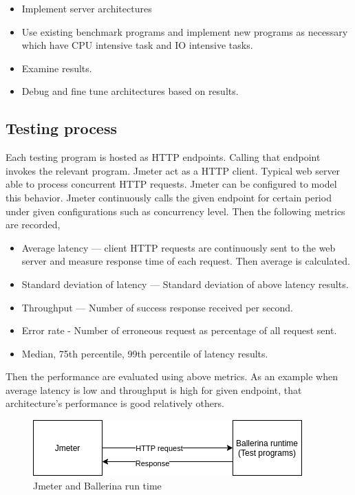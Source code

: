 \begin{itemize}
	\item Implement server architectures
	\item Use existing benchmark programs and implement new programs as necessary which have CPU intensive task and IO intensive tasks.
	\item Examine results.
	\item Debug and fine tune architectures based on results.
\end{itemize} 

\subsection{Testing process}

Each testing program is hosted as HTTP endpoints. Calling that endpoint invokes the relevant program. Jmeter act as a HTTP client. Typical web server able to process concurrent HTTP requests. Jmeter can be configured to model this behavior. Jmeter continuously calls the given endpoint for certain period under given configurations such as concurrency level. Then the following metrics are recorded,

\begin{itemize}
	\item Average latency — client HTTP requests are continuously sent to the web server and measure response time of each request. Then average is calculated.
	\item Standard deviation of latency — Standard deviation of above latency results.
	\item Throughput — Number of success response received per second.
	\item Error rate - Number of erroneous request as percentage of all request sent.
	\item Median, 75th percentile, 99th percentile of latency results.
\end{itemize} 

Then the performance are evaluated using above metrics. As an example when average latency is low and throughput is high for given endpoint, that architecture's performance is good relatively others.
  

\begin{figure}[htbp]
	\begin{center}
		\includegraphics[scale=0.5]{figures/jmeter_bal.png}
	\end{center}
	\caption{Jmeter and Ballerina run time}
	\label{jmeter_testing}
\end{figure}



